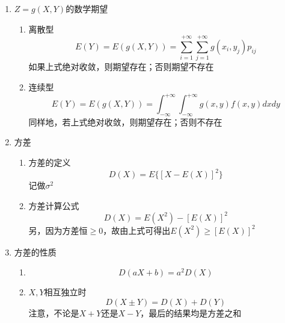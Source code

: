 \begin{enumerate}
	\item $Z=g(X,Y)$的数学期望
	\begin{enumerate}
		\item 离散型
			\begin{equation}
				E(Y) = E(g(X,Y)) = \sum_{i=1}^{+\infty}\sum_{j=1}^{+\infty} g(x_i, y_j)p_{ij}
			\end{equation}
			如果上式绝对收敛，则期望存在；否则期望不存在
		\item 连续型
			\begin{equation}
				E(Y) = E(g(X,Y)) = \int_{-\infty}^{+\infty}\int_{-\infty}^{+\infty}g(x,y)f(x,y)dxdy
			\end{equation}
			同样地，若上式绝对收敛，则期望存在；否则不存在
	\end{enumerate}

	\item 方差
	\begin{enumerate}
		\item 方差的定义
		\begin{equation}
			D(X) = E\{\left[X-E(X)\right]^2\}
		\end{equation}
		记做$\sigma^2$
		\item 方差计算公式
		\begin{equation}
			D(X) = E(X^2) - \left[ E(X) \right]^2
		\end{equation}
		另，因为方差恒$\geq 0$，故由上式可得出$E(X^2) \geq \left[ E(X) \right]^2$
	\end{enumerate}

	\item 方差的性质
	\begin{enumerate}
		\item 
		\begin{equation}
			D(aX+b) = a^2D(X)
		\end{equation}
		\item $X,Y$相互独立时
		\begin{equation}
			D(X\pm Y) = D(X) + D(Y)
		\end{equation}
		注意，不论是$X+Y$还是$X-Y$，最后的结果均是方差之和
	\end{enumerate}


\end{enumerate}
